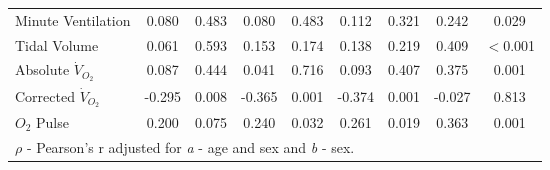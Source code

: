 \begin{table}[p]
\begin{tabular}{|l| c c | c c | c c | c c|}
		Minute Ventilation        & 0.080  & 0.483                     & 0.080  & 0.483                     & 0.112  & 0.321                     & 0.242  & 0.029                       \\
		Tidal Volume              & 0.061  & 0.593                     & 0.153  & 0.174                     & 0.138  & 0.219                     & 0.409  & $<$0.001                    \\
		Absolute $\dot{V}_{O_2}$  & 0.087  & 0.444                     & 0.041  & 0.716                     & 0.093  & 0.407                     & 0.375  & 0.001                       \\
		Corrected $\dot{V}_{O_2}$ & -0.295 & 0.008                     & -0.365 & 0.001                     & -0.374 & 0.001                     & -0.027 & 0.813                       \\
		$O_2$ Pulse               & 0.200  & 0.075                     & 0.240  & 0.032                     & 0.261  & 0.019                     & 0.363  & 0.001                       \\ \hline
		\multicolumn{9}{l}{$\rho$ - Pearson's r adjusted for \textit{a} - age and sex and \textit{b} - sex.}
	\end{tabular}
\end{table}
